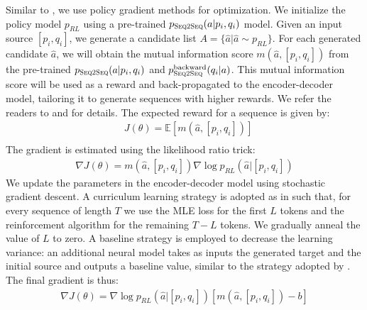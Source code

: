 Similar to , we use policy gradient methods \cite{sutton1999policy,williams1992simple} for optimization. We initialize the policy model $p_{RL}$ using a pre-trained $p_{{{\textsc{Seq2Seq}}}}(a|p_i,q_i)$ model. 
Given an input source $[p_i,q_i]$, 
we generate a candidate list  $A=\{\hat{a}|\hat{a}\sim p_{RL}\}$. 
For each generated candidate $\hat{a}$, we will obtain the mutual information score $m(\hat{a}, [p_i,q_i])$ from the pre-trained $p_{{{\textsc{Seq2Seq}}}}(a|p_i,q_i)$ and $p^{\text{backward}}_{{{\textsc{Seq2Seq}}}}(q_i|a)$.
This mutual information score will be used as a reward and back-propagated to the encoder-decoder model, tailoring it to generate sequences with higher rewards. 
We refer the readers to   and
 for details.  The expected reward for a sequence is given by:
\begin{equation}
\begin{aligned}
&J(\theta)=\mathbb{E} [m(\hat{a},[p_i,q_i]) ]\\
\end{aligned}
\end{equation}
The gradient is
estimated using the likelihood ratio trick:
\begin{equation}
\begin{aligned}
\nabla J(\theta)=m(\hat{a},[p_i,q_i])\nabla\log p_{RL}(\hat{a}|[p_i,q_i])
\end{aligned}
\end{equation}
We update the parameters in the encoder-decoder model using stochastic gradient descent. 
A
curriculum learning strategy is adopted \cite{bengio2009curriculum} 
as in   
such that, for
every sequence of length $T$ we use the MLE loss for the first $L$ tokens and the reinforcement algorithm for the remaining $T-L$ tokens. We gradually anneal 
the value of $L$ to zero.
A baseline strategy is employed to decrease the learning variance:
an additional neural model takes as inputs the generated target and the initial source and outputs a baseline value, similar to the strategy 
adopted by . 
 The final gradient is thus:
\begin{equation}
\begin{aligned}
\nabla J(\theta)=\nabla\log p_{RL}(\hat{a}|[p_i,q_i]) [m(\hat{a},[p_i,q_i])-b]
\end{aligned}
\end{equation}


